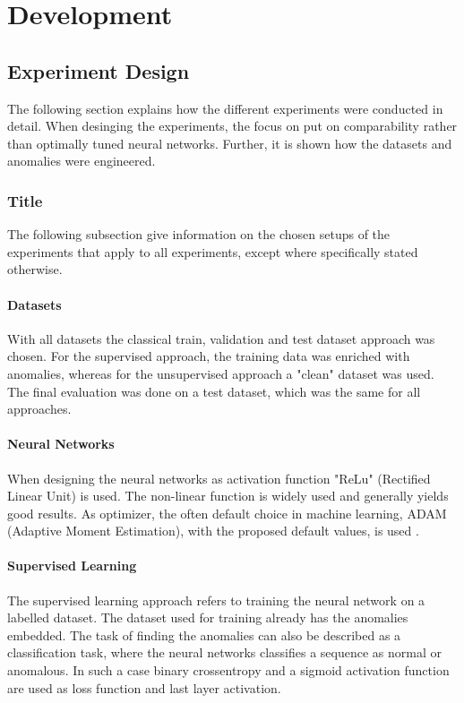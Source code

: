 \chapter{Development}

\section{Experiment Design}
The following section explains how the different experiments were conducted in detail. When desinging the experiments, the focus on put on comparability rather than optimally tuned neural networks.  Further, it is shown how the datasets and anomalies were engineered.

\subsection{Title}
The following subsection give information on the chosen setups of the experiments that apply to all experiments, except where specifically stated otherwise.

\subsubsection{Datasets}
With all datasets the classical train, validation and test dataset approach was chosen. For the supervised approach, the training data was enriched with anomalies, whereas for the unsupervised approach a "clean" dataset was used. The final evaluation was done on a test dataset, which was the same for all approaches.

\subsubsection{Neural Networks}
When designing the neural networks as activation function "ReLu" (Rectified Linear Unit) is used. The non-linear function is widely used and generally yields good results. As optimizer, the often default choice in machine learning, ADAM (Adaptive Moment Estimation), with the proposed default values, is used \parencite{AUTHOR,YEAR} .

\subsubsection{Supervised Learning}
The supervised learning approach refers to training the neural network on a labelled dataset. The dataset used for training already has the anomalies embedded. The task of finding the anomalies can also be described as a classification task, where the neural networks classifies a sequence as normal or anomalous. In such a case binary crossentropy and a sigmoid activation function are used as loss function and last layer activation.

